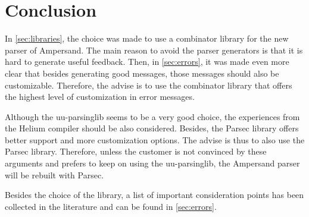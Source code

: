 
\section{Conclusion}
\label{sec:conclusion}
In \autoref{sec:libraries}, the choice was made to use a combinator library for the new parser of Ampersand.
The main reason to avoid the parser generators is that it is hard to generate useful feedback.
Then, in \autoref{sec:errors}, it was made even more clear that besides generating good messages, those messages should also be customizable.
Therefore, the advise is to use the combinator library that offers the highest level of customization in error messages.

Although the uu-parsinglib seems to be a very good choice, the experiences from the Helium compiler \cite{helium-parser} should be also considered.
Besides, the Parsec library offers better support and more customization options.
The advise is thus to also use the Parsec library.
Therefore, unless the customer is not convinced by these arguments and prefers to keep on using the uu-parsinglib, the Ampersand parser will be rebuilt with Parsec.

Besides the choice of the library, a list of important consideration points has been collected in the literature and can be found in \autoref{sec:errors}.